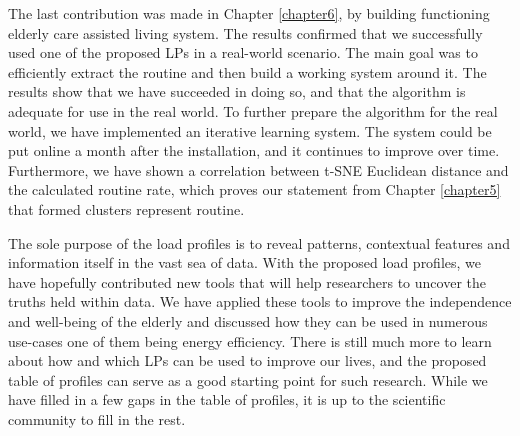 The last contribution was made in Chapter \ref{chapter6}, by building functioning elderly care assisted living system. 
The results confirmed that we successfully used one of the proposed LPs in a real-world scenario. 
The main goal was to efficiently extract the routine and then build a working system around it.
The results show that we have succeeded in doing so, and that the algorithm is adequate for use in the real world.
To further prepare the algorithm for the real world, we have implemented an iterative learning system.
The system could be put online a month after the installation, and it continues to improve over time.
Furthermore, we have shown a correlation between t-SNE Euclidean distance and the calculated routine rate,
which proves our statement from Chapter \ref{chapter5} that formed clusters represent routine.

The sole purpose of the load profiles is to reveal patterns, contextual features and information itself in the vast sea of data.
With the proposed load profiles, we have hopefully contributed new tools that will help researchers to uncover the truths held within data.
We have applied these tools to improve the independence and well-being of the elderly and discussed how they can be used in numerous use-cases one of them being energy efficiency.
There is still much more to learn about how and which LPs can be used to improve our lives, and the proposed table of profiles can serve as a good starting point for such research.
While we have filled in a few gaps in the table of profiles, it is up to the scientific community to fill in the rest.



